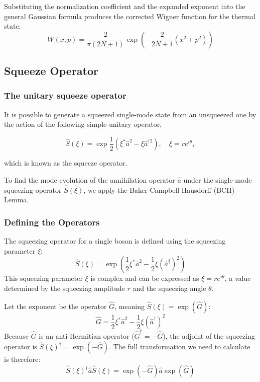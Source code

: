 {Substituting the normalization coefficient and the expanded exponent into the general Gaussian formula produces the corrected Wigner function for the thermal state:
\begin{equation}
    W(x,p) = \frac{2}{\pi(2N+1)} \exp\left(-\frac{2}{2N+1}(x^2+p^2)\right)
\end{equation}



\subsection{Squeeze Operator}

\subsubsection{The unitary squeeze operator}

It is possible to generate a squeezed single-mode state from an unsqueezed one by the action of the following simple unitary operator,

\begin{equation*}
\hat{S}(\xi)=\exp\frac{1}{2}(\xi^{*}\hat{a}^{ 2}-\xi\hat{a}^{\dagger 2}), \quad \xi=r e^{i\theta},
\end{equation*}

which is known as the squeeze operator.

To find the mode evolution of the annihilation operator $\hat{a}$ under the single-mode squeezing operator $\hat{S}(\xi)$, we apply the Baker-Campbell-Hausdorff (BCH) Lemma.

\subsubsection{Defining the Operators}
The squeezing operator for a single boson is defined using the squeezing parameter $\xi$:
\begin{equation}
\hat{S}(\xi) = \exp\left(\frac{1}{2}\xi^*\hat{a}^2 - \frac{1}{2}\xi(\hat{a}^\dagger)^2\right)
\end{equation}
This squeezing parameter $\xi$ is complex and can be expressed as $\xi = r e^{i\theta}$, a value determined by the squeezing amplitude $r$ and the squeezing angle $\theta$.

Let the exponent be the operator $\hat{G}$, meaning $\hat{S}(\xi) = \exp(\hat{G})$:
\begin{equation*}
\hat{G} = \frac{1}{2}\xi^*\hat{a}^2 - \frac{1}{2}\xi(\hat{a}^\dagger)^2
\end{equation*}
Because $\hat{G}$ is an anti-Hermitian operator ($\hat{G}^\dagger = -\hat{G}$), the adjoint of the squeezing operator is $\hat{S}(\xi)^\dagger = \exp(-\hat{G})$. The full transformation we need to calculate is therefore:
\begin{equation*}
\hat{S}(\xi)^\dagger \hat{a} \hat{S}(\xi) = \exp(-\hat{G}) \hat{a} \exp(\hat{G})
\end{equation*}

}
